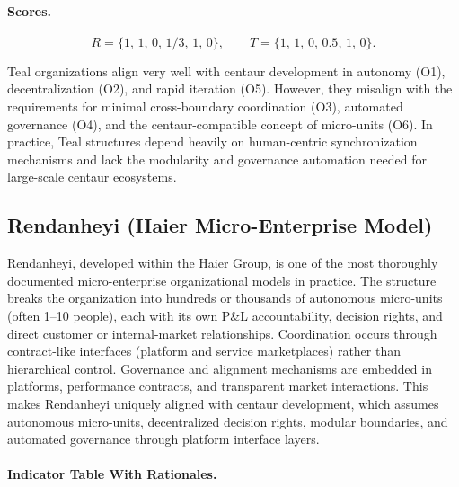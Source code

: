 \documentclass[11pt, a4paper, twocolumn]{article} %
\begin{document}
\paragraph{Scores.}

\[
R = \{1,\,1,\,0,\,1/3,\,1,\,0\},
\qquad
T = \{1,\,1,\,0,\,0.5,\,1,\,0\}.
\]

Teal organizations align very well with centaur development in autonomy (O1),
decentralization (O2), and rapid iteration (O5). However, they misalign with the
requirements for minimal cross-boundary coordination (O3), automated governance
(O4), and the centaur-compatible concept of micro-units (O6). In practice, Teal
structures depend heavily on human-centric synchronization mechanisms and lack
the modularity and governance automation needed for large-scale centaur
ecosystems.

\newpage
\subsection*{Rendanheyi (Haier Micro-Enterprise Model)}

Rendanheyi, developed within the Haier Group, is one of the most thoroughly
documented micro-enterprise organizational models in practice. The structure
breaks the organization into hundreds or thousands of autonomous micro-units
(often 1--10 people), each with its own P\&L accountability, decision rights,
and direct customer or internal-market relationships. Coordination occurs
through contract-like interfaces (platform and service marketplaces) rather
than hierarchical control. Governance and alignment mechanisms are embedded in
platforms, performance contracts, and transparent market interactions. This
makes Rendanheyi uniquely aligned with centaur development, which assumes
autonomous micro-units, decentralized decision rights, modular boundaries, and
automated governance through platform interface layers.

\paragraph{Indicator Table With Rationales.}
\end{document}
